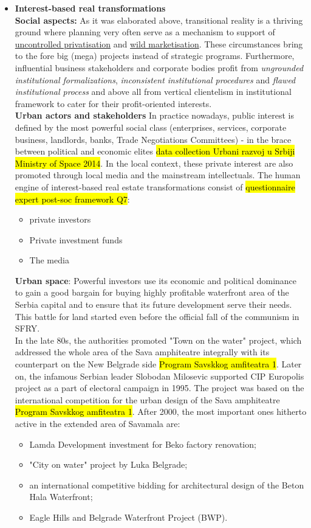 \documentclass[11pt]{report}
\begin{document}
\begin{itemize}
\item \textbf{Interest-based real transformations}
\\
\textbf{Social aspects:}
As it was elaborated above, transitional reality is a thriving ground where planning very often serve as a mechanism to support of \underline{uncontrolled privatisation} and \underline{wild marketisation}. These circumstances bring to the fore big (mega) projects instead of strategic programs. Furthermore, influential business stakeholders and corporate bodies profit from \textit{ungrounded institutional formalizations}, \textit{inconsistent institutional procedures} and \textit{flawed institutional process} and above all from vertical clientelism in institutional framework to cater for their profit-oriented interests.
\\
\textbf{Urban actors and stakeholders}
In  practice nowadays, public interest is defined by the most powerful social class (enterprises, services, corporate business, landlords, banks, Trade Negotiations Committees) - in the brace between political and economic elites \hl{data collection Urbani razvoj u Srbiji Ministry of Space 2014}. In the local context, these private interest are also promoted through local media and the mainstream intellectuals.
The human engine of interest-based real estate transformations consist of \hl{questionnaire expert post-soc framework Q7}:
\begin{itemize}
\item private investors
\item Private investment funds
\item The media
\end{itemize}

\textbf{Urban space}:
Powerful investors use its economic and political dominance to gain a good bargain for buying highly profitable waterfront area of the Serbia capital and to ensure that its future development serve their needs. This battle for land started even before the official fall of the communism in SFRY.
\\
In the late 80s, the authorities promoted "Town on the water" project, which addressed the whole area of the Sava amphiteatre integrally with its counterpart on the New Belgrade side \hl{Program Savskkog amfiteatra 1}.
Later on, the infamous Serbian leader Slobodan Milosevic supported CIP Europolis project as a part of electoral campaign in 1995. The project was based on the international competition for the urban design of the Sava amphiteatre \hl{Program Savskkog amfiteatra 1}.
After 2000, the most important ones hitherto active in the extended area of Savamala are:
\begin{itemize}
\item Lamda Development investment for Beko factory renovation;
\item "City on water" project by Luka Belgrade;
\item an international competitive bidding for architectural design of the Beton Hala Waterfront;
\item Eagle Hills and Belgrade Waterfront Project (BWP).
\end{itemize}


\end{itemize}
\end{document}
